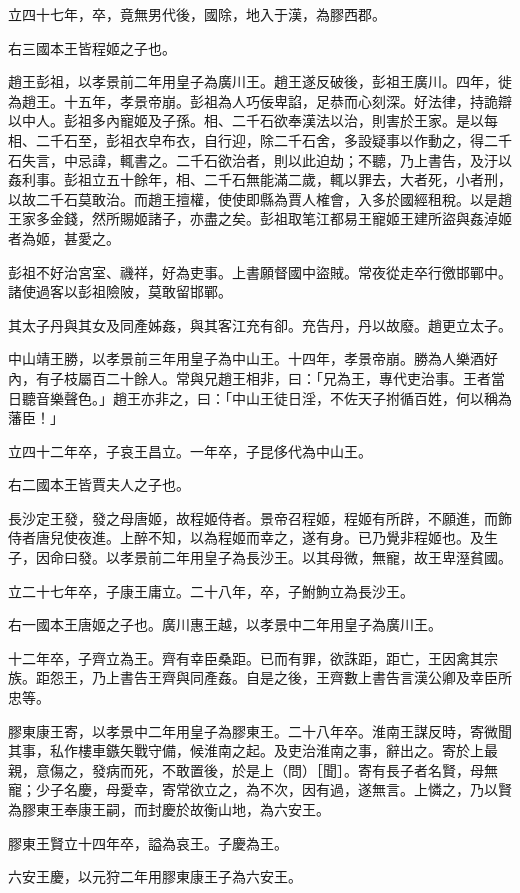 \begin{pinyinscope}
立四十七年，卒，竟無男代後，國除，地入于漢，為膠西郡。

右三國本王皆程姬之子也。

趙王彭祖，以孝景前二年用皇子為廣川王。趙王遂反破後，彭祖王廣川。四年，徙為趙王。十五年，孝景帝崩。彭祖為人巧佞卑諂，足恭而心刻深。好法律，持詭辯以中人。彭祖多內寵姬及子孫。相、二千石欲奉漢法以治，則害於王家。是以每相、二千石至，彭祖衣皁布衣，自行迎，除二千石舍，多設疑事以作動之，得二千石失言，中忌諱，輒書之。二千石欲治者，則以此迫劫；不聽，乃上書告，及汙以姦利事。彭祖立五十餘年，相、二千石無能滿二歲，輒以罪去，大者死，小者刑，以故二千石莫敢治。而趙王擅權，使使即縣為賈人榷會，入多於國經租稅。以是趙王家多金錢，然所賜姬諸子，亦盡之矣。彭祖取笔江都易王寵姬王建所盜與姦淖姬者為姬，甚愛之。

彭祖不好治宮室、禨祥，好為吏事。上書願督國中盜賊。常夜從走卒行徼邯鄲中。諸使過客以彭祖險陂，莫敢留邯鄲。

其太子丹與其女及同產姊姦，與其客江充有卻。充告丹，丹以故廢。趙更立太子。

中山靖王勝，以孝景前三年用皇子為中山王。十四年，孝景帝崩。勝為人樂酒好內，有子枝屬百二十餘人。常與兄趙王相非，曰：「兄為王，專代吏治事。王者當日聽音樂聲色。」趙王亦非之，曰：「中山王徒日淫，不佐天子拊循百姓，何以稱為藩臣！」

立四十二年卒，子哀王昌立。一年卒，子昆侈代為中山王。

右二國本王皆賈夫人之子也。

長沙定王發，發之母唐姬，故程姬侍者。景帝召程姬，程姬有所辟，不願進，而飾侍者唐兒使夜進。上醉不知，以為程姬而幸之，遂有身。已乃覺非程姬也。及生子，因命曰發。以孝景前二年用皇子為長沙王。以其母微，無寵，故王卑溼貧國。

立二十七年卒，子康王庸立。二十八年，卒，子鮒鮈立為長沙王。

右一國本王唐姬之子也。廣川惠王越，以孝景中二年用皇子為廣川王。

十二年卒，子齊立為王。齊有幸臣桑距。已而有罪，欲誅距，距亡，王因禽其宗族。距怨王，乃上書告王齊與同產姦。自是之後，王齊數上書告言漢公卿及幸臣所忠等。

膠東康王寄，以孝景中二年用皇子為膠東王。二十八年卒。淮南王謀反時，寄微聞其事，私作樓車鏃矢戰守備，候淮南之起。及吏治淮南之事，辭出之。寄於上最親，意傷之，發病而死，不敢置後，於是上（問）［聞］。寄有長子者名賢，母無寵；少子名慶，母愛幸，寄常欲立之，為不次，因有過，遂無言。上憐之，乃以賢為膠東王奉康王嗣，而封慶於故衡山地，為六安王。

膠東王賢立十四年卒，謚為哀王。子慶為王。

六安王慶，以元狩二年用膠東康王子為六安王。


\end{pinyinscope}
